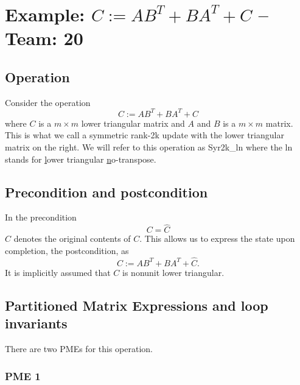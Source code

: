 \chapter{Example: $ C := A B ^ T + B A ^ T + C $ --  \large Team: 20}



\section{Operation}

Consider the operation
\[
C := A B ^ T + B A ^ T + C
\]
where $ C $ is a $ m \times m $ lower triangular matrix and $ A $ and $ B $ is a $ m \times m $ matrix.
This is what we call a symmetric rank-2k update
with the {\sc l}ower triangular matrix on the {\sc r}ight.
We will refer to this operation
as {\sc Syr2k\_ln} where the {\sc ln} stands for
\underline{l}ower triangular
\underline{n}o-transpose.

\section{Precondition and postcondition}

In the precondition 
\[
C = \widehat C
\]
$ \widehat C $ denotes the original contents of $ C $.
This allows us to express the state upon completion, the postcondition, as
\[
C := A B ^ T + B A ^ T + \widehat C.
\]
It is implicitly assumed that $ C $ is nonunit lower triangular.
\section{Partitioned Matrix Expressions and loop invariants}

There are two PMEs for this operation.

\subsection{PME 1}

